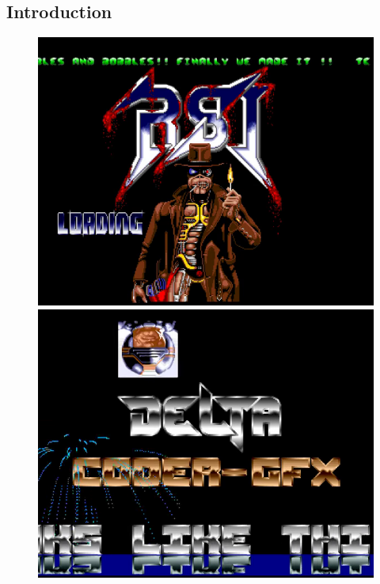 \subsection*{Introduction}
\begin{figure}[h]
  \begin{minipage}[b]{0.30\linewidth}
    \centering
    \includegraphics[width=\linewidth]{images/demoscene/demos/mega1.png}
  \end{minipage}
  \hfill
  \begin{minipage}[b]{0.30\linewidth}
    \centering
    \includegraphics[width=\linewidth]{images/demoscene/demos/mega2.png}

\end{minipage}
\end{figure}
